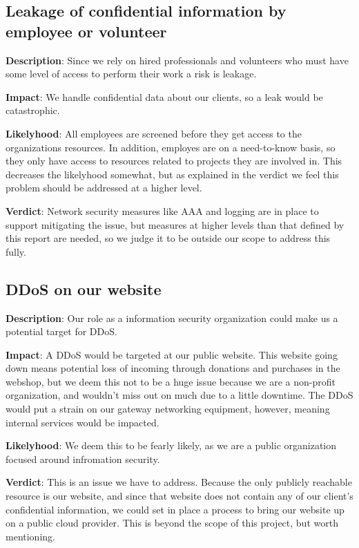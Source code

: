\subsection{Leakage of confidential information by employee or volunteer}

\textbf{Description}: Since we rely on hired professionals and volunteers who must have some level of access to perform their work a risk is leakage.

\textbf{Impact}: We handle confidential data about our clients, so a leak would be catastrophic.

\textbf{Likelyhood}: All employees are screened before they get access to the organizations resources. In addition, employes are on a need-to-know basis, so they only have access to resources related to projects they are involved in. This decreases the likelyhood somewhat, but as explained in the verdict we feel this problem should be addressed at a higher level.

\textbf{Verdict}: Network security measures like AAA and logging are in place to support mitigating the issue, but measures at higher levels than that defined by this report are needed, so we judge it to be outside our scope to address this fully.

\subsection{DDoS on our website}

\textbf{Description}: Our role as a information security organization could make us a potential target for DDoS.

\textbf{Impact}: A DDoS would be targeted at our public website. This website going down means potential loss of incoming through donations and purchases in the webshop, but we deem this not to be a huge issue because we are a non-profit organization, and wouldn't miss out on much due to a little downtime. The DDoS would put a strain on our gateway networking equipment, however, meaning internal services would be impacted.

\textbf{Likelyhood}: We deem this to be fearly likely, as we are a public organization focused around infromation security.

\textbf{Verdict}: This is an issue we have to address. Because the only publicly reachable resource is our website, and since that website does not contain any of our client's confidential information, we could set in place a process to bring our website up on a public cloud provider. This is beyond the scope of this project, but worth mentioning. 


